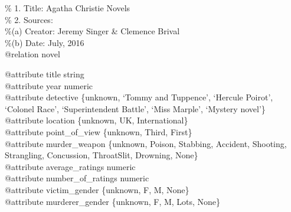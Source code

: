 \documentclass{mproj}
\begin{document}
\% 1. Title: Agatha Christie Novels\\
\% 2. Sources:\\
\%\hspace{5mm}(a) Creator: Jeremy Singer \& Clemence Brival\\
\%\hspace{5mm}(b) Date: July, 2016\\
@relation novel

@attribute title string\\
@attribute year numeric\\
@attribute detective \{unknown, `Tommy and Tuppence', `Hercule Poirot', `Colonel Race', `Superintendent Battle', `Miss Marple', `Mystery novel'\}\\
@attribute location \{unknown, UK, International\}\\
@attribute point\_of\_view \{unknown, Third, First\}\\
@attribute murder\_weapon \{unknown, Poison, Stabbing, Accident, Shooting, Strangling, Concussion, ThroatSlit, Drowning, None\}\\
@attribute average\_ratings numeric\\
@attribute number\_of\_ratings numeric\\
@attribute victim\_gender \{unknown, F, M, None\}\\
@attribute murderer\_gender \{unknown, F, M, Lots, None\}
\end{document}
